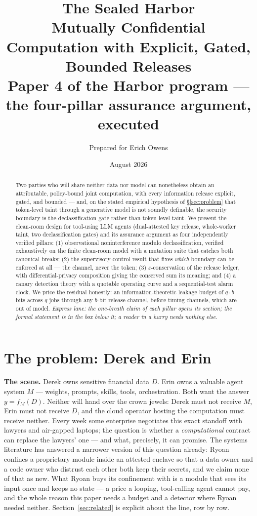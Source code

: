 \documentclass[11pt,a4paper]{article}
\title{\textbf{The Sealed Harbor}\\[4pt]
\large Mutually Confidential Computation with Explicit, Gated, Bounded Releases\\[3pt]
\normalsize Paper 4 of the Harbor program --- the four-pillar assurance argument, executed}
\author{Prepared for Erich Owens}
\date{August 2026}
\begin{document}
\maketitle

\begin{abstract}
\noindent Two parties who will share neither data nor model can nonetheless obtain an attributable, policy-bound joint
computation, with every information release explicit, gated, and bounded --- and, on the stated empirical hypothesis of
\S\ref{sec:problem} that token-level taint through a generative model is not soundly definable, the security boundary is the
declassification gate rather than token-level taint. We present the clean-room design for tool-using LLM agents (dual-attested key
release, whole-worker taint, two declassification gates) and its assurance argument as four independently verified pillars: (1) observational
noninterference modulo declassification, verified exhaustively on the finite clean-room model with a mutation suite that catches
both canonical breaks; (2) the supervisory-control result that fixes \emph{which} boundary can be enforced at all --- the channel,
never the token; (3) $\varepsilon$-conservation of the release ledger, with differential-privacy composition giving the conserved
sum its meaning; and (4) a canary detection theory with a quotable operating curve and a sequential-test alarm clock. We price the
residual honestly: an information-theoretic leakage budget of $q\cdot b$ bits across $q$ jobs through any $b$-bit release channel,
before timing channels, which are out of model. \emph{Express lane: the one-breath claim of each pillar opens its section; the
formal statement is in the box below it; a reader in a hurry needs nothing else.}
\end{abstract}

\section{The problem: Derek and Erin}\label{sec:problem}

\textbf{The scene.} Derek owns sensitive financial data $D$. Erin owns a valuable agent system $M$ --- weights, prompts, skills,
tools, orchestration. Both want the answer $y=f_M(D)$. Neither will hand over the crown jewels: Derek must not receive $M$, Erin
must not receive $D$, and the cloud operator hosting the computation must receive neither. Every week some enterprise negotiates
this exact standoff with lawyers and air-gapped laptops; the question is whether a \emph{computational} contract can replace the
lawyers' one --- and what, precisely, it can promise. The systems literature has answered a narrower version of this question
already: Ryoan \cite{ryoan16} confines a proprietary module inside an attested enclave so that a data owner and a code owner who
distrust each other both keep their secrets, and we claim none of that as new. What Ryoan buys its confinement with is a module
that sees its input once and keeps no state --- a price a looping, tool-calling agent cannot pay, and the whole reason this paper
needs a budget and a detector where Ryoan needed neither. Section~\ref{sec:related} is explicit about the line, row by row.
\end{document}

